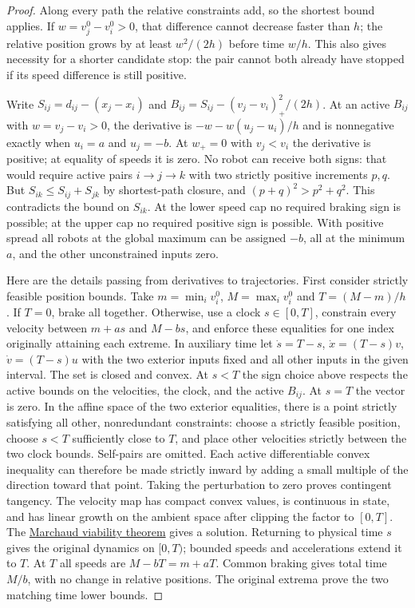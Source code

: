 \documentclass[11pt]{article}
\begin{document}
\begin{proof}
Along every path the relative constraints add, so the shortest bound applies. If $w=v_j^0-v_i^0>0$, that difference cannot decrease faster than $h$; the relative position grows by at least $w^2/(2h)$ before time $w/h$. This also gives necessity for a shorter candidate stop: the pair cannot both already have stopped if its speed difference is still positive.

Write $S_{ij}=d_{ij}-(x_j-x_i)$ and $B_{ij}=S_{ij}-(v_j-v_i)_+^2/(2h)$. At an active $B_{ij}$ with $w=v_j-v_i>0$, the derivative is $-w-w(u_j-u_i)/h$ and is nonnegative exactly when $u_i=a$ and $u_j=-b$. At $w_+=0$ with $v_j<v_i$ the derivative is positive; at equality of speeds it is zero. No robot can receive both signs: that would require active pairs $i\to j\to k$ with two strictly positive increments $p,q$. But $S_{ik}\le S_{ij}+S_{jk}$ by shortest-path closure, and $(p+q)^2>p^2+q^2$. This contradicts the bound on $S_{ik}$. At the lower speed cap no required braking sign is possible; at the upper cap no required positive sign is possible. With positive spread all robots at the global maximum can be assigned $-b$, all at the minimum $a$, and the other unconstrained inputs zero.

Here are the details passing from derivatives to trajectories. First consider strictly feasible position bounds. Take $m=\min_i v_i^0$, $M=\max_i v_i^0$ and $T=(M-m)/h$. If $T=0$, brake all together. Otherwise, use a clock $s\in[0,T]$, constrain every velocity between $m+as$ and $M-bs$, and enforce these equalities for one index originally attaining each extreme. In auxiliary time let $\dot s=T-s$, $\dot x=(T-s)v$, $\dot v=(T-s)u$ with the two exterior inputs fixed and all other inputs in the given interval. The set is closed and convex. At $s<T$ the sign choice above respects the active bounds on the velocities, the clock, and the active $B_{ij}$. At $s=T$ the vector is zero. In the affine space of the two exterior equalities, there is a point strictly satisfying all other, nonredundant constraints: choose a strictly feasible position, choose $s<T$ sufficiently close to $T$, and place other velocities strictly between the two clock bounds. Self-pairs are omitted. Each active differentiable convex inequality can therefore be made strictly inward by adding a small multiple of the direction toward that point. Taking the perturbation to zero proves contingent tangency. The velocity map has compact convex values, is continuous in state, and has linear growth on the ambient space after clipping the factor to $[0,T]$. The \href{https://bayen.berkeley.edu/sites/default/files/siam08.pdf}{Marchaud viability theorem} gives a solution. Returning to physical time $s$ gives the original dynamics on $[0,T)$; bounded speeds and accelerations extend it to $T$. At $T$ all speeds are $M-bT=m+aT$. Common braking gives total time $M/b$, with no change in relative positions. The original extrema prove the two matching time lower bounds.


\end{proof}
\end{document}
